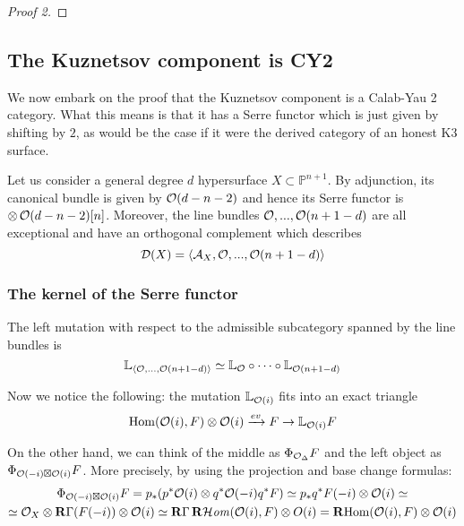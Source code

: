 \begin{proof}[Proof 2]
    
    
\end{proof}


\subsection{The Kuznetsov component is CY2}
We now embark on the proof that the Kuznetsov component is a Calab-Yau 2 category. What this means is that it has a Serre functor which is just given by shifting by $2$, as would be the case if it were the derived category of an honest K3 surface.

    

Let us consider a general degree $d$ hypersurface $X \subset \mathbb{P}^{n+1}$. By adjunction, its canonical bundle is given by $\mathcal{O}(d-n-2)$ and hence its Serre functor is $\otimes \,\mathcal{O}(d-n-2)[n] $. Moreover, the line bundles $\mathcal{O},...,\mathcal{O}(n+1-d)$ are all exceptional and have an orthogonal complement which describes $$\mathcal{D}(X)=\langle \mathcal{A}_X,\mathcal{O},...,\mathcal{O}(n+1-d) \rangle $$

\subsubsection{The kernel of the Serre functor}

The left mutation with respect to the admissible subcategory spanned by the line bundles is $$\mathbb{L}_{\langle \mathcal{O}, \dots, \mathcal{O}(n+1-d) \rangle}\simeq \mathbb{L}_{\mathcal{O}} \circ \dots \circ \mathbb{L}_{\mathcal{O}(n+1-d)}$$

Now we notice the following: the mutation $\mathbb{L}_{\mathcal{O}(i)}$ fits into an exact triangle $$\operatorname{Hom}(\mathcal{O}(i), F)\otimes \mathcal{O}(i) \xrightarrow{ev} F \rightarrow \mathbb{L}_{\mathcal{O}(i)} F$$

On the other hand, we can think of the middle as $\Phi_{\mathcal{O}_\Delta}F$ and the left object as $\Phi_{\mathcal{O}(-i)\boxtimes \mathcal{O}(i)}F$. More precisely, by using the projection and base change formulas:
\begin{gather*}
    \Phi_{\mathcal{O}(-i)\boxtimes \mathcal{O}(i)}F=p_* (p^*\mathcal{O}(i)\otimes q^* \mathcal{O}(-i)q^*F)\simeq p_* q^* F(-i)\otimes \mathcal{O}(i)\simeq\\
    \simeq \mathcal{O}_X \otimes \operatorname{\mathbf{R}\Gamma} (F(-i))\otimes \mathcal{O}(i)\simeq \operatorname{\mathbf{R}\Gamma} \operatorname{\mathbf{R}\mathcal{H}\mathit{om}}(\mathcal{O}(i),F) \otimes O(i)=\operatorname{\mathbf{R} Hom}(\mathcal{O}(i),F) \otimes \mathcal{O}(i)
\end{gather*}


